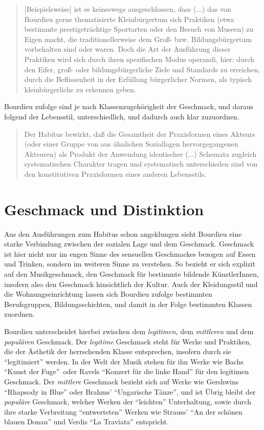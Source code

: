 \documentclass[a4paper, german, oneside]{scrbook}
\begin{document}
\blockquote[{\cite[71]{schwingel_pierre_2009}}]{[Beispielsweise] ist es keineswegs ausgeschlossen, dass (...) das von Bourdieu gerne thematisierte Kleinbürgertum sich Praktiken (etwa bestimmte prestigeträchtige Sportarten oder den Besuch von Museen) zu Eigen macht, die traditionellerweise dem Groß- bzw. Bildungsbürgertum vorbehalten sind oder waren. Doch die Art der Ausführung dieser Praktiken wird sich durch ihren spezifischen Modus operandi, hier: durch den Eifer, groß- oder bildungsbürgerliche Ziele und Standards zu erreichen, durch die Beflissenheit in der Erfüllung bürgerlicher Normen, als typisch kleinbürgerliche zu erkennen geben.}

Bourdieu zufolge sind je nach Klassenzugehörigkeit der Geschmack, und daraus folgend der Lebensstil, unterschiedlich, und dadurch auch klar zuzuordnen. 

\blockquote[{\cite[278]{bourdieu_feinen_2012}}]{Der Habitus bewirkt, daß die Gesamtheit der Praxisformen eines Akteurs (oder einer Gruppe von aus ähnlichen Soziallagen hervorgegangenen Akteuren) als Produkt der Anwendung identischer (...) Schemata zugleich systematischen Charakter tragen und systematisch unterschieden sind von den konstitutiven Praxisformen eines anderen Lebensstils.}

\section{Geschmack und Distinktion}
Aus den Ausführungen zum Habitus schon angeklungen sieht Bourdieu eine starke Verbindung zwischen der sozialen Lage und dem Geschmack. Geschmack ist hier nicht nur im engen Sinne des sensuellen Geschmackes bezogen auf Essen und Trinken, sondern im weiteren Sinne zu verstehen. So bezieht er sich explizit auf den Musikgeschmack, den Geschmack für bestimmte bildende KünstlerInnen, insofern also den Geschmack hinsichtlich der Kultur. Auch der Kleidungsstil und die Wohnungseinrichtung lassen sich Bourdieu zufolge bestimmten Berufsgruppen, Bildungsschichten, und damit in der Folge bestimmten Klassen zuordnen. \parencite[vgl.][25]{bourdieu_feinen_2012}

Bourdieu unterscheidet hierbei zwischen dem \emph{legitimen}, dem \emph{mittleren} und dem \emph{populären} Geschmack. Der \emph{legitime} Geschmack steht für Werke und Praktiken, die der Ästhetik der herrschenden Klasse entsprechen, insofern durch sie \enquote{legitimiert} werden. \parencite[vgl.][551]{joas_sozialtheorie:_2004} In der Welt der Musik stehen für ihn Werke wie Bachs \enquote{Kunst der Fuge} oder Ravels \enquote{Konzert für die linke Hand} für den legitimen Geschmack. Der \emph{mittlere} Geschmack bezieht sich auf Werke wie Gershwins \enquote{Rhapsody in Blue} oder Brahms' \enquote{Ungarische Tänze}, und ist  Übrig bleibt der \emph{populäre} Geschmack, welcher Werken der \enquote{leichten} Unterhaltung, sowie durch ihre starke Verbreitung \enquote{entwerteten} Werken wie Strauss' \enquote{An der schönen blauen Donau} und Verdis \enquote{La Traviata} entspricht. \parencite[vgl.][38]{bourdieu_feinen_2012}
\end{document}
